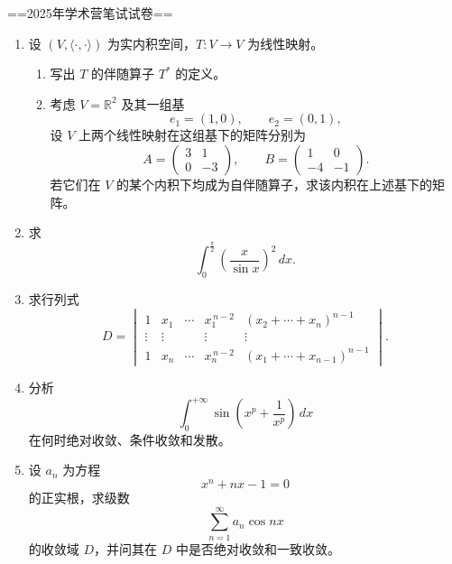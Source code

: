 
==2025年学术营笔试试卷==
\begin{enumerate}
    \item 设 $(V,\langle \cdot,\cdot\rangle)$ 为实内积空间，$T:V\to V$ 为线性映射。
    \begin{enumerate}
        \item 写出 $T$ 的伴随算子 $T^*$ 的定义。
        
        \item 考虑 $V=\mathbb{R}^2$ 及其一组基
        \[
        e_1=(1,0),\qquad e_2=(0,1),
        \]
        设 $V$ 上两个线性映射在这组基下的矩阵分别为
        \[
        A=
        \begin{pmatrix}
        3 & 1\\
        0 & -3
        \end{pmatrix},
        \qquad
        B=
        \begin{pmatrix}
        1 & 0\\
        -4 & -1
        \end{pmatrix}.
        \]
        若它们在 $V$ 的某个内积下均成为自伴随算子，求该内积在上述基下的矩阵。
    \end{enumerate}

    \item 求
    \[
    \int_0^{\frac{\pi}{2}} \left(\frac{x}{\sin x}\right)^2 \, dx .
    \]

    \item 求行列式
    \[
    D=
    \begin{vmatrix}
    1 & x_1 & \cdots & x_1^{\,n-2} & (x_2+\cdots+x_n)^{n-1}\\
    \vdots & \vdots & & \vdots & \vdots\\
    1 & x_n & \cdots & x_n^{\,n-2} & (x_1+\cdots+x_{n-1})^{n-1}
    \end{vmatrix}.
    \]

    \item 分析
    \[
    \int_0^{+\infty} \sin\left(x^p+\frac{1}{x^p}\right)\,dx
    \]
    在何时绝对收敛、条件收敛和发散。

    \item 设 $a_n$ 为方程
    \[
    x^n+nx-1=0
    \]
    的正实根，求级数
    \[
    \sum_{n=1}^{\infty} a_n \cos nx
    \]
    的收敛域 $D$，并问其在 $D$ 中是否绝对收敛和一致收敛。


\end{enumerate}
